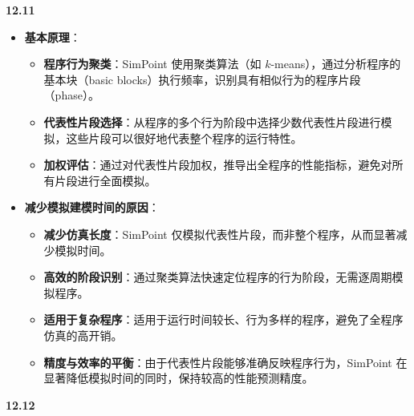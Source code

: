 \documentclass[UTF8]{report}
\begin{document}
\noindent
\textbf{12.11}

\begin{itemize}
    \item \textbf{基本原理}：
    \begin{itemize}
        \item \textbf{程序行为聚类}：SimPoint 使用聚类算法（如 $k$-means），通过分析程序的基本块（basic blocks）执行频率，识别具有相似行为的程序片段（phase）。
        \item \textbf{代表性片段选择}：从程序的多个行为阶段中选择少数代表性片段进行模拟，这些片段可以很好地代表整个程序的运行特性。
        \item \textbf{加权评估}：通过对代表性片段加权，推导出全程序的性能指标，避免对所有片段进行全面模拟。
    \end{itemize}

    \item \textbf{减少模拟建模时间的原因}：
    \begin{itemize}
        \item \textbf{减少仿真长度}：SimPoint 仅模拟代表性片段，而非整个程序，从而显著减少模拟时间。
        \item \textbf{高效的阶段识别}：通过聚类算法快速定位程序的行为阶段，无需逐周期模拟程序。
        \item \textbf{适用于复杂程序}：适用于运行时间较长、行为多样的程序，避免了全程序仿真的高开销。
        \item \textbf{精度与效率的平衡}：由于代表性片段能够准确反映程序行为，SimPoint 在显著降低模拟时间的同时，保持较高的性能预测精度。
    \end{itemize}
\end{itemize}

\noindent
\textbf{12.12}
\end{document}
